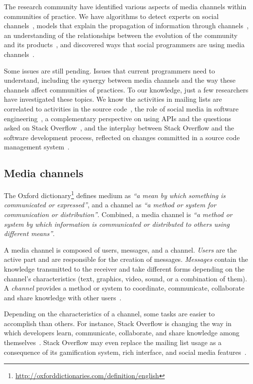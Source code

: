 \documentclass{sig-alternate-05-2015}
\begin{document}
	The research community have identified various aspects of media channels within communities of practice.
	We have algorithms to detect experts on social channels~\cite{Pal2011a,Pal2012a}, models that explain the propagation of information through channels~\cite{Jin2013, Jiang2013}, an understanding of the relationships between the evolution of the community and its products~\cite{German2013}, and discovered ways that social programmers are using media channels~\cite{Sowe2008a, Singh2009, Parnin2013}.

	Some issues are still pending.
	Issues that current programmers need to understand, including the synergy between media channels and the way these channels affect communities of practices.
	To our knowledge, just a few researchers have investigated these topics.
	We know the activities in mailing lists are correlated to activities in the source code~\cite{Bird2006}, the role of social media in software engineering~\cite{Storey2014, Storey2010}, a complementary perspective on using APIs and the questions asked on Stack Overflow~\cite{Kavaler2013}, and the interplay between Stack Overflow and the software development process, reflected on changes committed in a source code management system~\cite{Vasilescu2013a}.

\subsection{Media channels}

	The Oxford dictionary\footnote{\url{http://oxforddictionaries.com/definition/english}} defines medium as \textit{``a mean by which something is communicated or expressed''}, and a channel as \textit{``a method or system for communication or distribution''}.
	Combined, a media channel is \textit{``a method or system by which information is communicated or distributed to others using different means''}.

	A media channel is composed of users, messages, and a channel.
	\textit{Users} are the active part and are responsible for the creation of messages.
	\textit{Messages} contain the knowledge transmitted to the receiver and take different forms depending on the channel's characteristics (text, graphics, video, sound, or a combination of them).
	A \textit{channel} provides a method or system to coordinate, communicate, collaborate and share knowledge with other users~\cite{Storey2014}.

Depending on the characteristics of a channel, some tasks are easier to accomplish than others.
For instance, Stack Overflow is changing the way in which developers learn, communicate, collaborate, and share knowledge among themselves~\cite{Storey2014}.
Stack Overflow may even replace the mailing list usage as a consequence of its gamification system, rich interface, and social media features~\cite{Vasilescu2014b}.
\end{document}
